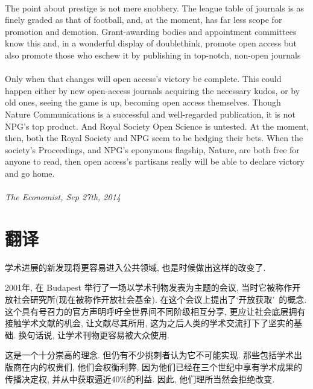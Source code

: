\documentclass[a4paper, 12pt, UTF8]{article}
\begin{document}
\paragraph*{}
    The point about prestige is not mere snobbery. The league table of journals is as finely graded as that of football, and, at the moment, has far less scope for promotion and demotion. Grant-awarding bodies and appointment committees know this and, in a wonderful display of doublethink, promote open access but also promote those who eschew it by publishing in top-notch, non-open journals

\paragraph*{}
    Only when that changes will open access’s victory be complete. This could happen either by new open-access journals acquiring the necessary kudos, or by old ones, seeing the game is up, becoming open access themselves. Though Nature Communications is a successful and well-regarded publication, it is not NPG’s top product. And Royal Society Open Science is untested. At the moment, then, both the Royal Society and NPG seem to be hedging their bets. When the society’s Proceedings, and NPG’s eponymous flagship, Nature, are both free for anyone to read, then open access’s partisans really will be able to declare victory and go home.

\paragraph*{}
    \emph{\small The Economist, Sep 27th, 2014}

\section{翻译}
学术进展的新发现将更容易进入公共领域, 也是时候做出这样的改变了.

2001年, 在 Budapest 举行了一场以学术刊物发表为主题的会议, 当时它被称作开放社会研究所(现在被称作开放社会基金). 在这个会议上提出了\lq 开放获取\rq\ 的概念. 这个具有号召力的官方声明呼吁全世界间不同阶级相互分享, 更应让社会底层拥有接触学术文献的机会, 让文献尽其所用, 这为之后人类的学术交流打下了坚实的基础. 换句话说, 让学术刊物更容易被大众使用.

这是一个十分崇高的理念. 但仍有不少挑刺者认为它不可能实现. 那些包括学术出版商在内的权贵们, 他们会权衡利弊, 因为他们已经在三个世纪中享有学术成果的传播决定权, 并从中获取逼近40\%的利益. 因此, 他们理所当然会拒绝改变.
\end{document}
